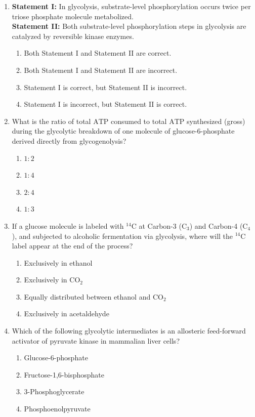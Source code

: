 \documentclass[11pt, a4paper]{article}
\begin{document}
\begin{enumerate}[label=\textbf{\arabic*.}]
\item \textbf{Statement I:} In glycolysis, substrate-level phosphorylation occurs twice per triose phosphate molecule metabolized. \\
\textbf{Statement II:} Both substrate-level phosphorylation steps in glycolysis are catalyzed by reversible kinase enzymes.
\begin{enumerate}[label=(\Alph*)]
    \item Both Statement I and Statement II are correct.
    \item Both Statement I and Statement II are incorrect.
    \item Statement I is correct, but Statement II is incorrect.
    \item Statement I is incorrect, but Statement II is correct.
\end{enumerate}

\item What is the ratio of total $\text{ATP}$ consumed to total $\text{ATP}$ synthesized (gross) during the glycolytic breakdown of one molecule of glucose-6-phosphate derived directly from glycogenolysis?
\begin{enumerate}[label=(\Alph*)]
    \item $1 : 2$
    \item $1 : 4$
    \item $2 : 4$
    \item $1 : 3$
\end{enumerate}

\item If a glucose molecule is labeled with $^{14}\text{C}$ at Carbon-3 ($\text{C}_3$) and Carbon-4 ($\text{C}_4$), and subjected to alcoholic fermentation via glycolysis, where will the $^{14}\text{C}$ label appear at the end of the process?
\begin{enumerate}[label=(\Alph*)]
    \item Exclusively in ethanol
    \item Exclusively in $\text{CO}_2$
    \item Equally distributed between ethanol and $\text{CO}_2$
    \item Exclusively in acetaldehyde
\end{enumerate}

\item Which of the following glycolytic intermediates is an allosteric feed-forward activator of pyruvate kinase in mammalian liver cells?
\begin{enumerate}[label=(\Alph*)]
    \item Glucose-6-phosphate
    \item Fructose-1,6-bisphosphate
    \item 3-Phosphoglycerate
    \item Phosphoenolpyruvate
\end{enumerate}


\end{enumerate}
\end{document}
